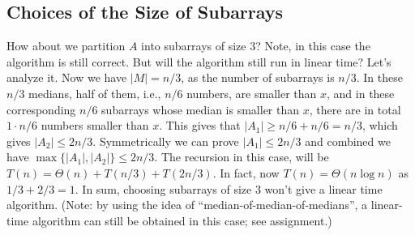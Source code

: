 

\subsection*{Choices of the Size of Subarrays}

How about we partition $A$ into subarrays of size 3?
Note, in this case the algorithm is still correct.
But will the algorithm still run in linear time?
Let's analyze it.
Now we have $|M| = n/3$, as the number of subarrays is $n/3$.
In these $n/3$ medians, half of them, i.e., $n/6$ numbers, are smaller than $x$,
and in these corresponding $n/6$ subarrays whose median is smaller than $x$, there are in total $1\cdot n/6$ numbers smaller than $x$.
This gives that $|A_1| \ge n/6 + n/6 = n/3$, which gives $|A_2| \le 2n/3$. Symmetrically we can prove $|A_1| \le 2n/3$ and combined we have 
$\max\{|A_1|, |A_2|\} \le 2n/3$.
The recursion in this case, will be $T(n) = \Theta(n) + T(n/3) + T(2n/3)$.
In fact, now $T(n) = \Theta(n\log n)$ as $1/3 + 2/3 = 1$. 
In sum, choosing subarrays of size 3 won't give a linear time algorithm.
(Note: by using the idea of ``median-of-median-of-medians'', a linear-time
algorithm can still be obtained in this case; see assignment.)


